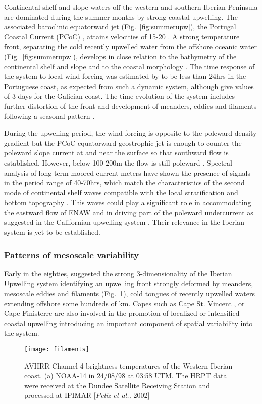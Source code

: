  Continental shelf and slope waters off the western and southern
Iberian Peninsula are dominated during the summer months by strong
coastal upwelling. The associated baroclinic equatorward jet
(Fig.~\ref{fig:summerupw}), the Portugal Coastal Current (PCoC)
\citep{Ambar94}, attains velocities of 15-20\velc
\citep{Fiuza84,Mcclain86}. A strong temperature front, separating
the cold recently upwelled water from the offshore oceanic water
(Fig.~\ref{fig:summerupw}), develops in close relation to the
bathymetry of the continental shelf and slope and to the coastal
morphology \citep{Fiuza83}. The time response of the system to
local wind forcing was estimated by \citet{Sousa86} to be less
than 24hrs in the Portuguese coast, as expected from such a
dynamic system, although \citet{Mcclain86} give values of 3 days
for the Galician coast. The time evolution of the system includes
further distortion of the front and development of meanders,
eddies and filaments following a seasonal pattern
\citep{Haynes93}.

During the upwelling period, the wind forcing is opposite to the
poleward density gradient but the PCoC equatorward geostrophic jet
is enough to counter the poleward slope current at and near the
surface so that southward flow is established. However, below
100-200m the flow is still poleward \citep{Haynes90,Huthnance02}.
Spectral analysis of long-term moored current-meters have shown
the presence of signals in the period range of 40-70hrs, which
match the characteristics of the second mode of continental shelf
waves compatible with the local stratification and bottom
topography \citep{Fiuza96}. This waves could play a significant
role in accommodating the eastward flow of ENAW
\citep{Huthnance95} and in driving part of the poleward
undercurrent as suggested in the Californian upwelling system
\citep[e.g.][]{Wang97}. Their relevance in the Iberian system is
yet to be established.

\subsubsection{Patterns of mesoscale variability}
Early in the eighties, \citet{Fiuza83} suggested the strong
3-dimensionality of the Iberian Upwelling system identifying an
upwelling front strongly deformed by meanders, mesoscale eddies
and filaments (Fig.~\ref{fig:litomexfil}), cold tongues of
recently upwelled waters extending offshore some hundreds of km.
Capes such as Cape St. Vincent \citep{Sousa86,Relvas99}, or Cape
Finisterre \citep{Blanton84} are also involved in the promotion of
localized or intensified coastal upwelling introducing an
important component of spatial variability into the system.
\begin{figure}
  \centering
  \texttt{[image: filaments]}
  \caption{AVHRR Channel 4 brightness temperatures of the Western
  Iberian coast. (a) NOAA-14 in 24/08/98 at 03:58 UTM.
 The HRPT data were received at the Dundee
Satellite Receiving Station and processed at IPIMAR [{\it Peliz et
al., }2002] }
  \label{fig:litomexfil}
\end{figure}

